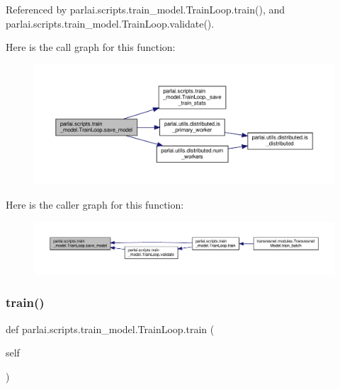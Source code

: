 Referenced by parlai.\+scripts.\+train\+\_\+model.\+Train\+Loop.\+train(), and parlai.\+scripts.\+train\+\_\+model.\+Train\+Loop.\+validate().

Here is the call graph for this function\+:
\nopagebreak
\begin{figure}[H]
\begin{center}
\leavevmode
\includegraphics[width=350pt]{classparlai_1_1scripts_1_1train__model_1_1TrainLoop_a352f759a644e87251c37931bf276309a_cgraph}
\end{center}
\end{figure}
Here is the caller graph for this function\+:
\nopagebreak
\begin{figure}[H]
\begin{center}
\leavevmode
\includegraphics[width=350pt]{classparlai_1_1scripts_1_1train__model_1_1TrainLoop_a352f759a644e87251c37931bf276309a_icgraph}
\end{center}
\end{figure}
\mbox{\label{classparlai_1_1scripts_1_1train__model_1_1TrainLoop_a8c15c0d4490891fd3e61e57501474e40}} 
\subsubsection{\texorpdfstring{train()}{train()}}
{\footnotesize\ttfamily def parlai.\+scripts.\+train\+\_\+model.\+Train\+Loop.\+train (\begin{DoxyParamCaption}\item[{}]{self }\end{DoxyParamCaption})}

